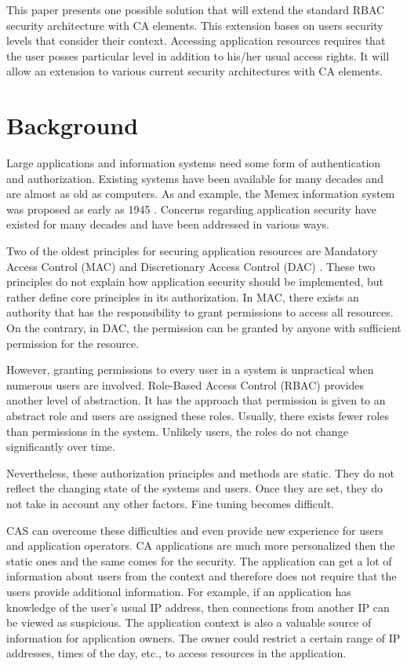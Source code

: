 \documentclass{sig-alternate}
\begin{document}
This paper presents  one possible solution that will extend the standard RBAC security architecture with CA elements. This extension bases on users security levels that consider their context. Accessing application resources requires that the user posses particular level in addition to his/her usual access rights. It will allow an extension to various current security architectures with CA elements.

\section{Background}
Large applications and information systems need some form of authentication and authorization. Existing systems have been available for many decades and are almost as old as computers. As and example, the Memex information system was proposed as early as 1945 \cite{memex}. Concerns regarding application security have existed for many decades and have been addressed in various ways.

Two of the oldest principles for securing application resources are Mandatory Access Control (MAC) \cite{accesscontrol} and Discretionary Access Control (DAC) \cite{accesscontrol}. These two principles do not explain how application security should be implemented, but rather define core principles in its authorization. In MAC, there exists an authority that has the responsibility to grant permissions to access all resources. On the contrary, in DAC, the permission can be granted by anyone with sufficient permission for the resource.

However, granting permissions to every user in a system is unpractical when numerous users are involved. Role-Based Access Control (RBAC) \cite{rbac} provides another level of abstraction. It has the approach that permission is given to an abstract role and users are assigned these roles. Usually, there exists fewer roles than permissions in the system. Unlikely users, the roles do not change significantly over time.

Nevertheless, these authorization principles and methods are static. They do not reflect the changing state of the systems and users. Once they are set, they do not take in account any other factors. Fine tuning becomes difficult.

CAS can overcome these difficulties and even provide new experience for users and application operators. CA applications are much more personalized then the static ones and the same comes for the security. The application can get a lot of information about users from the context and therefore does not require that the users provide additional information. For example, if an application has knowledge of the user's usual IP address, then connections from another IP can be viewed as suspicious. The application context is also a valuable source of information for application owners. The owner could restrict a certain range of IP addresses, times of the day, etc., to access resources in the application. 
\end{document}

